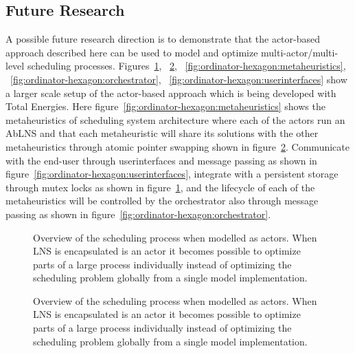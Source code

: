 \subsection{Future Research}
\label{sec:discussion:future_research}
A possible future research direction is to demonstrate that
the actor-based approach described here can be used to model and optimize 
multi-actor/multi-level scheduling processes. 
Figures~\ref{fig:ordinator-hexagon:persistence},
~\ref{fig:ordinator-hexagon:atomicpointerswap},
~\ref{fig:ordinator-hexagon:metaheuristics},
~\ref{fig:ordinator-hexagon:orchestrator},
~\ref{fig:ordinator-hexagon:userinterfaces}
show a larger scale setup of the actor-based approach which is being developed with Total Energies.
Here figure~\ref{fig:ordinator-hexagon:metaheuristics}
shows the metaheuristics of scheduling system architecture where each of the actors run an AbLNS
and that each metaheuristic will share its solutions with the other
metaheuristics through atomic pointer swapping shown in figure~\ref{fig:ordinator-hexagon:atomicpointerswap}.
Communicate with the end-user
through userinterfaces and message passing as shown in figure~\ref{fig:ordinator-hexagon:userinterfaces}, 
integrate with a persistent storage through mutex
locks as shown in figure~\ref{fig:ordinator-hexagon:persistence}, 
and the lifecycle of each of the metaheuristics will be controlled by
the orchestrator also through message passing as shown in figure~\ref{fig:ordinator-hexagon:orchestrator}. 

% 	
\begin{figure}[H]
	\centering
	
	\resizebox{0.7\textwidth}{!}{
		\drawModelSetupHexagon[persistence=true]
	}
	\caption{
		Overview of the scheduling process when modelled as actors. When LNS is encapsulated 
		is an actor it becomes possible to optimize parts of a large process individually instead of 
		optimizing the scheduling problem globally from a single model implementation.
	}
	\label{fig:ordinator-hexagon:persistence}
\end{figure}
\begin{figure}[H]
	\centering
	
	\resizebox{0.7\textwidth}{!}{
		\drawModelSetupHexagon[atomicpointerswap=true]
	}
	\caption{
		Overview of the scheduling process when modelled as actors. When LNS is encapsulated 
		is an actor it becomes possible to optimize parts of a large process individually instead of 
		optimizing the scheduling problem globally from a single model implementation.
	}
	\label{fig:ordinator-hexagon:atomicpointerswap}
\end{figure}

